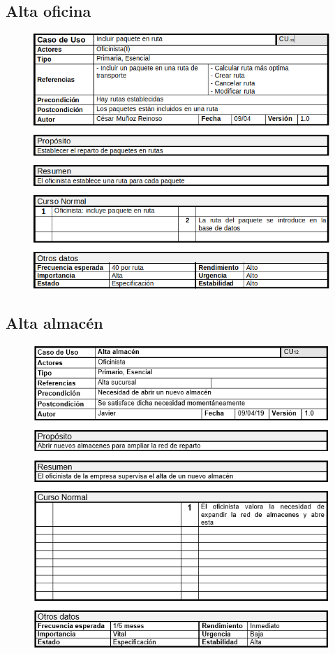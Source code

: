 \subsection{Alta oficina}
\begin{figure}[H]
	\centering
	\includegraphics[width=16cm]{11}
\end{figure}
\subsection{Alta almacén}
\begin{figure}[H]
	\centering
	\includegraphics[width=16cm]{12}
\end{figure}
